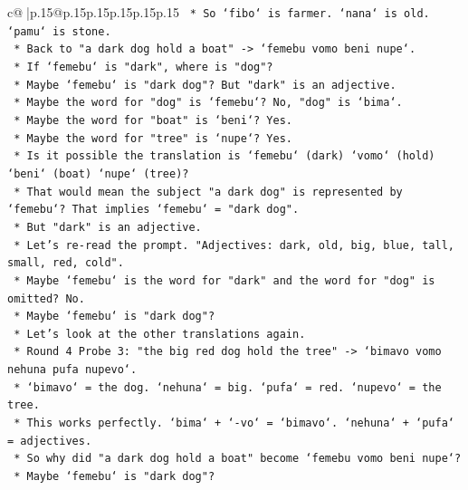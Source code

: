\documentclass{article}
\begin{document}
{\begin{supertabular}{c@{$\;$}|p{.15\linewidth}@{}p{.15\linewidth}p{.15\linewidth}p{.15\linewidth}p{.15\linewidth}p{.15\linewidth}}
{{{\texttt{                    *   So `fibo` is farmer. `nana` is old. `pamu` is stone.} \\
\texttt{                *   Back to "a dark dog hold a boat" {-}> `femebu vomo beni nupe`.} \\
\texttt{                    *   If `femebu` is "dark", where is "dog"?} \\
\texttt{                    *   Maybe `femebu` is "dark dog"? But "dark" is an adjective.} \\
\texttt{                    *   Maybe the word for "dog" is `femebu`? No, "dog" is `bima`.} \\
\texttt{                    *   Maybe the word for "boat" is `beni`? Yes.} \\
\texttt{                    *   Maybe the word for "tree" is `nupe`? Yes.} \\
\texttt{                    *   Is it possible the translation is `femebu` (dark) `vomo` (hold) `beni` (boat) `nupe` (tree)?} \\
\texttt{                    *   That would mean the subject "a dark dog" is represented by `femebu`? That implies `femebu` = "dark dog".} \\
\texttt{                    *   But "dark" is an adjective.} \\
\texttt{                    *   Let's re{-}read the prompt. "Adjectives: dark, old, big, blue, tall, small, red, cold".} \\
\texttt{                    *   Maybe `femebu` is the word for "dark" and the word for "dog" is omitted? No.} \\
\texttt{                    *   Maybe `femebu` is "dark dog"?} \\
\texttt{                    *   Let's look at the other translations again.} \\
\texttt{                    *   Round 4 Probe 3: "the big red dog hold the tree" {-}> `bimavo vomo nehuna pufa nupevo`.} \\
\texttt{                        *   `bimavo` = the dog. `nehuna` = big. `pufa` = red. `nupevo` = the tree.} \\
\texttt{                        *   This works perfectly. `bima` + `{-}vo` = `bimavo`. `nehuna` + `pufa` = adjectives.} \\
\texttt{                    *   So why did "a dark dog hold a boat" become `femebu vomo beni nupe`?} \\
\texttt{                    *   Maybe `femebu` is "dark dog"?} \\
}}}
\end{supertabular}}
\end{document}
